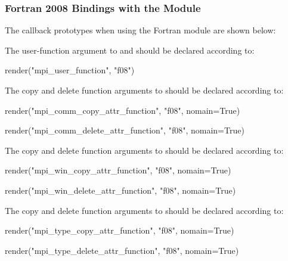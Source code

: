 \subsubsection{Fortran 2008 Bindings with the \texorpdfstring{}{mpi\_f08} Module}

The callback prototypes when using the Fortran  module are shown below:
 
The user-function argument to 
and  should be declared according to:
 
\begin{mpi-binding}
    render("mpi_user_function", "f08")
\end{mpi-binding}
 
%
The copy and delete function arguments to  should be
declared according to:
%

\begin{mpi-binding}
    render("mpi_comm_copy_attr_function", "f08", nomain=True)
\end{mpi-binding}
\begin{mpi-binding}
    render("mpi_comm_delete_attr_function", "f08", nomain=True)
\end{mpi-binding}
 
%
The copy and delete function arguments to  should be
declared according to:
%

\begin{mpi-binding}
    render("mpi_win_copy_attr_function", "f08", nomain=True)
\end{mpi-binding}
\begin{mpi-binding}
    render("mpi_win_delete_attr_function", "f08", nomain=True)
\end{mpi-binding}

%
The copy and delete function arguments to  should be
declared according to:
%

\begin{mpi-binding}
    render("mpi_type_copy_attr_function", "f08", nomain=True)
\end{mpi-binding}
\begin{mpi-binding}
    render("mpi_type_delete_attr_function", "f08", nomain=True)
\end{mpi-binding}

